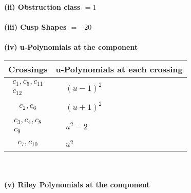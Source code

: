\documentclass[1p]{elsarticle_modified}
\theoremstyle{definition}
\begin{document}
\flushleft \textbf{(ii) Obstruction class $= 1$}\\~\\
\flushleft \textbf{(iii) Cusp Shapes $= -20$}\\~\\
\newpage\renewcommand{\arraystretch}{1}
\flushleft \textbf{(iv) u-Polynomials at the component}\newline \\
\begin{tabular}{m{50pt}|m{274pt}}
Crossings & \hspace{64pt}u-Polynomials at each crossing \\
\hline $$\begin{aligned}c_{1},c_{5},c_{11}\\c_{12}\end{aligned}$$&$\begin{aligned}
&(u-1)^2
\end{aligned}$\\
\hline $$\begin{aligned}c_{2},c_{6}\end{aligned}$$&$\begin{aligned}
&(u+1)^2
\end{aligned}$\\
\hline $$\begin{aligned}c_{3},c_{4},c_{8}\\c_{9}\end{aligned}$$&$\begin{aligned}
&u^2-2
\end{aligned}$\\
\hline $$\begin{aligned}c_{7},c_{10}\end{aligned}$$&$\begin{aligned}
&u^2
\end{aligned}$\\
\hline
\end{tabular}\\~\\
\newpage\renewcommand{\arraystretch}{1}
\flushleft \textbf{(v) Riley Polynomials at the component}\newline \\
\end{document}
